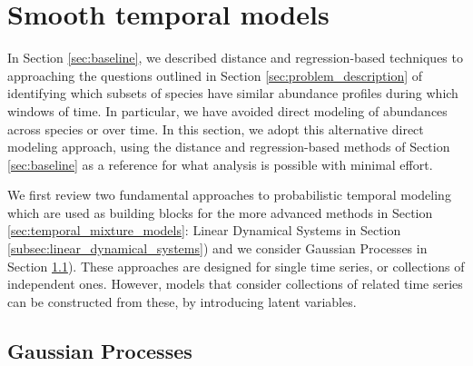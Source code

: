 \section{Smooth temporal models}
\label{sec:smooth_temporal_models}

In Section \ref{sec:baseline}, we described distance and regression-based
techniques to approaching the questions outlined in Section
\ref{sec:problem_description} of identifying which subsets of species have
similar abundance profiles during which windows of time. In particular, we have
avoided direct modeling of abundances across species or over time. In this
section, we adopt this alternative direct modeling approach, using the distance
and regression-based methods of Section \ref{sec:baseline} as a reference for
what analysis is possible with minimal effort.

We first review two fundamental approaches to probabilistic temporal modeling
which are used as building blocks for the more advanced methods in Section
\ref{sec:temporal_mixture_models}: Linear Dynamical Systems in Section
\ref{subsec:linear_dynamical_systems}) and we consider Gaussian Processes in
Section \ref{subsec:gaussian_processes}). These approaches are designed for
single time series, or collections of independent ones. However, models that
consider collections of related time series can be constructed from these, by
introducing latent variables.

\subsection{Gaussian Processes}
\label{subsec:gaussian_processes}

